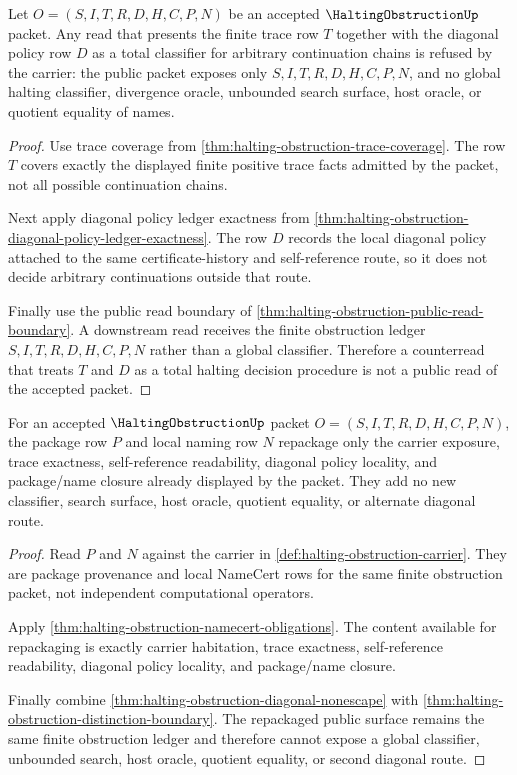 \begin{theorem}
\label{thm:halting-obstruction-finite-counterread-refusal}
Let $O=(S,I,T,R,D,H,C,P,N)$ be an accepted $\HaltingObstructionUp$ packet. Any read that presents the finite trace row $T$ together with the diagonal policy row $D$ as a total classifier for arbitrary continuation chains is refused by the carrier: the public packet exposes only $S,I,T,R,D,H,C,P,N$, and no global halting classifier, divergence oracle, unbounded search surface, host oracle, or quotient equality of names.
\end{theorem}
\begin{proof}
Use trace coverage from \autoref{thm:halting-obstruction-trace-coverage}. The row $T$ covers exactly the displayed finite positive trace facts admitted by the packet, not all possible continuation chains.

Next apply diagonal policy ledger exactness from \autoref{thm:halting-obstruction-diagonal-policy-ledger-exactness}. The row $D$ records the local diagonal policy attached to the same certificate-history and self-reference route, so it does not decide arbitrary continuations outside that route.

Finally use the public read boundary of \autoref{thm:halting-obstruction-public-read-boundary}. A downstream read receives the finite obstruction ledger $S,I,T,R,D,H,C,P,N$ rather than a global classifier. Therefore a counterread that treats $T$ and $D$ as a total halting decision procedure is not a public read of the accepted packet.
\end{proof}

\begin{theorem}
\label{thm:halting-obstruction-local-namecert-repackaging}
For an accepted $\HaltingObstructionUp$ packet $O=(S,I,T,R,D,H,C,P,N)$, the package row $P$ and local naming row $N$ repackage only the carrier exposure, trace exactness, self-reference readability, diagonal policy locality, and package/name closure already displayed by the packet. They add no new classifier, search surface, host oracle, quotient equality, or alternate diagonal route.
\end{theorem}
\begin{proof}
Read $P$ and $N$ against the carrier in \autoref{def:halting-obstruction-carrier}. They are package provenance and local NameCert rows for the same finite obstruction packet, not independent computational operators.

Apply \autoref{thm:halting-obstruction-namecert-obligations}. The content available for repackaging is exactly carrier habitation, trace exactness, self-reference readability, diagonal policy locality, and package/name closure.

Finally combine \autoref{thm:halting-obstruction-diagonal-nonescape} with \autoref{thm:halting-obstruction-distinction-boundary}. The repackaged public surface remains the same finite obstruction ledger and therefore cannot expose a global classifier, unbounded search, host oracle, quotient equality, or second diagonal route.
\end{proof}

